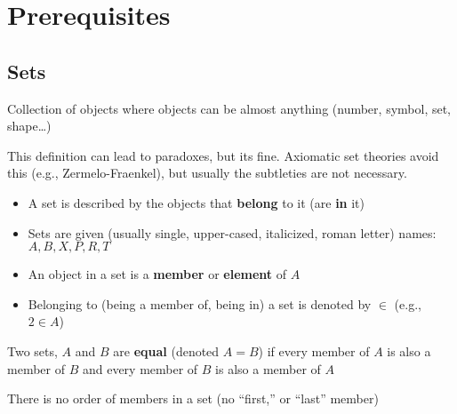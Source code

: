 \setcounter{chapter}{-1}
\chapter{Prerequisites}
\section{Sets}
\begin{definition*}[Set]\label{def:set}
    Collection of objects where objects can be almost anything (number, symbol, set, shape\dots)
\end{definition*}
\begin{note}
    This definition can lead to paradoxes, but its fine. Axiomatic set theories avoid this (e.g., Zermelo-Fraenkel), but usually the subtleties are not necessary.
\end{note}
\begin{itemize}
    \item A set is described by the objects that \textbf{belong} to it (are \textbf{in} it)
    \item Sets are given (usually single, upper-cased, italicized, roman letter) names: $A, B, X, P, R, T$
    \item An object in a set is a \textbf{member} or \textbf{element} of $A$
    \item Belonging to (being a member of, being in) a set is denoted by $\in$ (e.g., $2 \in A$)
\end{itemize}

\begin{definition}[Equal]\label{def:equal}
    Two sets, $A$ and $B$ are \textbf{equal} (denoted $A = B$) if every member of $A$ is also a member of $B$ and every member of $B$ is also a member of $A$
    \begin{note}
        There is no order of members in a set (no ``first,'' or ``last'' member)
    \end{note}
\end{definition}
